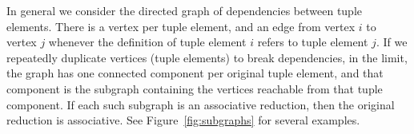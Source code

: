 In general we consider the directed graph of dependencies between tuple elements. There is a vertex per tuple element, and an edge from vertex $i$ to vertex $j$ whenever the definition of tuple element $i$ refers to tuple element $j$. If we repeatedly duplicate vertices (tuple elements) to break dependencies, in the limit, the graph has one connected component per original tuple element, and that component is the subgraph containing the vertices reachable from that tuple component. If each such subgraph is an associative reduction, then the original reduction is associative. See Figure~\ref{fig:subgraphs} for several examples.




